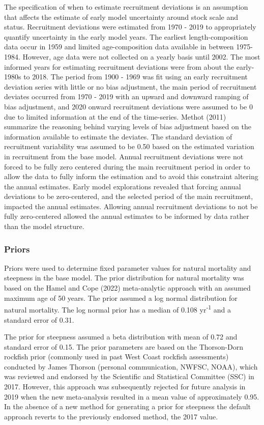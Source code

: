\documentclass[11pt,
  english,
  letterpaper,
]{article}
\begin{document}
The specification of when to estimate recruitment deviations is an assumption that affects the estimate of early model uncertainty around stock scale and status. Recruitment deviations were estimated from 1970 - 2019 to appropriately quantify uncertainty in the early model years. The earliest length-composition data occur in 1959 and limited age-composition data available in between 1975-1984. However, age data were not collected on a yearly basis until 2002. The most informed years for estimating recruitment deviations were from about the early-1980s to 2018. The period from 1900 - 1969 was fit using an early recruitment deviation series with little or no bias adjustment, the main period of recruitment deviates occurred from 1970 - 2019 with an upward and downward ramping of bias adjustment, and 2020 onward recruitment deviations were assumed to be 0 due to limited information at the end of the time-series. Methot (2011) summarize the reasoning behind varying levels of bias adjustment based on the information available to estimate the deviates. The standard deviation of recruitment variability was assumed to be 0.50 based on the estimated variation in recruitment from the base model. Annual recruitment deviations were not forced to be fully zero centered during the main recruitment period in order to allow the data to fully inform the estimation and to avoid this constraint altering the annual estimates. Early model explorations revealed that forcing annual deviations to be zero-centered, and the selected period of the main recruitment, impacted the annual estimates. Allowing annual recruitment deviations to not be fully zero-centered allowed the annual estimates to be informed by data rather than the model structure.

\hypertarget{priors}{%
\subsubsection{Priors}\label{priors}}

Priors were used to determine fixed parameter values for natural mortality and steepness in the base model. The prior distribution for natural mortality was based on the Hamel and Cope (2022) meta-analytic approach with an assumed maximum age of 50 years. The prior assumed a log normal distribution for natural mortality. The log normal prior has a median of 0.108 yr\textsuperscript{-1} and a standard error of 0.31.

The prior for steepness assumed a beta distribution with mean of 0.72 and standard error of 0.15. The prior parameters are based on the Thorson-Dorn rockfish prior (commonly used in past West Coast rockfish assessments) conducted by James Thorson (personal communication, NWFSC, NOAA), which was reviewed and endorsed by the Scientific and Statistical Committee (SSC) in 2017. However, this approach was subsequently rejected for future analysis in 2019 when the new meta-analysis resulted in a mean value of approximately 0.95. In the absence of a new method for generating a prior for steepness the default approach reverts to the previously endorsed method, the 2017 value.
\end{document}
